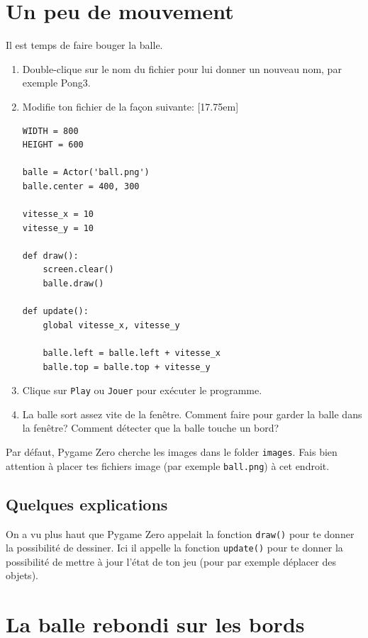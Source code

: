 \documentclass[11pt]{article}
\begin{document}
\section{Un peu de mouvement}

Il est temps de faire bouger la balle.

\begin{enumerate}
    \item Double-clique sur le nom du fichier pour lui donner un nouveau nom, par exemple Pong3.
    \item Modifie ton fichier de la façon suivante:
    \marginnote{\textcolor{deepblue}{update~=~mettre à jour}}[17.75em]
\begin{lstlisting}
WIDTH = 800
HEIGHT = 600

balle = Actor('ball.png')
balle.center = 400, 300

vitesse_x = 10
vitesse_y = 10

def draw():
    screen.clear()
    balle.draw()

def update():
    global vitesse_x, vitesse_y

    balle.left = balle.left + vitesse_x
    balle.top = balle.top + vitesse_y
\end{lstlisting}

    \item Clique sur \texttt{Play} ou \texttt{Jouer} pour exécuter le programme.

    \item La balle sort assez vite de la fenêtre.
    Comment faire pour garder la balle dans la fenêtre?
    Comment détecter que la balle touche un bord?
\end{enumerate}

Par défaut, Pygame Zero cherche les images dans le folder \texttt{images}. Fais bien attention à placer tes fichiers image (par exemple \texttt{ball.png}) à cet endroit.

\subsection*{Quelques explications}

On a vu plus haut que Pygame Zero appelait la fonction \lstinline{draw()} pour te donner la possibilité de dessiner. Ici il appelle la fonction \lstinline{update()} pour te donner la possibilité de mettre à jour l'état de ton jeu (pour par exemple déplacer des objets).

\section{La balle rebondi sur les bords}
\end{document}
